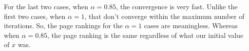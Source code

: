 \documentclass[12pt]{article}
\begin{document}
\begin{itemize}
\begin{table}[H]
{}
\end{table} 

For the last two cases, when $\alpha = 0.85$, the convergence is very fast.  Unlike the first two cases, when $\alpha = 1$, that don't converge within the maximum number of iterations.  So, the page rankings for the $\alpha=1$ cases are meaningless.  Whereas when $\alpha = 0.85$, the page ranking is the same regardless of what our initial value of $x$ was.\\

\end{itemize}
\end{document}
